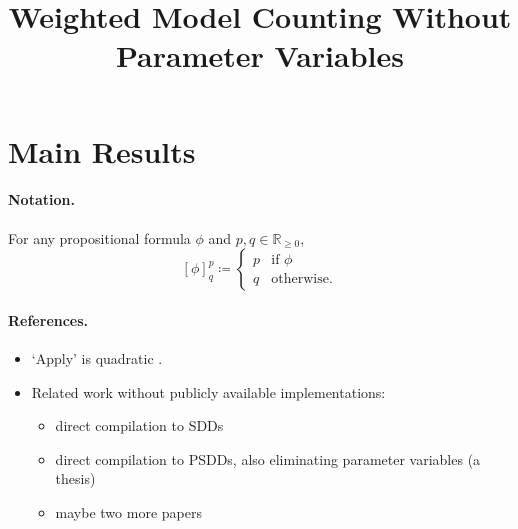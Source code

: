 \documentclass{article}
\title{Weighted Model Counting Without Parameter Variables}
\theoremstyle{definition}
\theoremstyle{remark}
\begin{document}
\maketitle

\section{Main Results}

\paragraph{Notation.} For any propositional formula $\phi$ and $p, q \in
\mathbb{R}_{\ge 0}$,
\[
  [\phi]^p_q \coloneqq
  \begin{cases}
    p & \text{if } \phi \\
    q & \text{otherwise.}
  \end{cases}
\]


\paragraph{References.}
\begin{itemize}
\item `Apply' is quadratic \cite{DBLP:journals/tc/Bryant86}.
\item Related work without publicly available implementations:
  \begin{itemize}
  \item direct compilation to SDDs \cite{DBLP:conf/ecsqaru/ChoiKD13}
  \item direct compilation to PSDDs, also eliminating parameter variables (a thesis)
  \item maybe two more papers
  \end{itemize}
\end{itemize}
\end{document}
